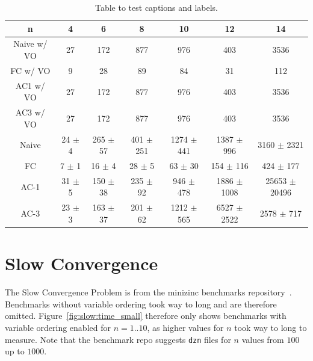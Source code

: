 \begin{table}[h!]
	\centering
	\begin{tabular}{|c|c|c|c|c|c|c|}
		\hline
		n           & 4          & 6            & 8             & 10             & 12              & 14                \\ \hline
		Naive w/ VO & 27         & 172          & 877           & 976            & 403             & 3536              \\ \hline
		FC w/ VO    & 9          & 28           & 89            & 84             & 31              & 112               \\ \hline
		AC1 w/ VO   & 27         & 172          & 877           & 976            & 403             & 3536              \\ \hline
		AC3 w/ VO   & 27         & 172          & 877           & 976            & 403             & 3536              \\ \hline
		Naive       & 24 $\pm$ 4 & 265 $\pm$ 57 & 401 $\pm$ 251 & 1274 $\pm$ 441 & 1387 $\pm$ 996  & 3160 $\pm$ 2321   \\ \hline
		FC          & 7 $\pm$ 1  & 16 $\pm$ 4   & 28 $\pm$ 5    & 63 $\pm$ 30    & 154 $\pm$ 116   & 424 $\pm$ 177     \\ \hline
		AC-1        & 31 $\pm$ 5 & 150 $\pm$ 38 & 235 $\pm$ 92  & 946 $\pm$ 478  & 1886 $\pm$ 1008 & 25653 $\pm$ 20496 \\ \hline
		AC-3        & 23 $\pm$ 3 & 163 $\pm$ 37 & 201 $\pm$ 62  & 1212 $\pm$ 565 & 6527 $\pm$ 2522 & 2578 $\pm$ 717    \\ \hline
	\end{tabular}
	\caption{Table to test captions and labels.}
	\label{tab:queens:iterations}
\end{table}

\section{Slow Convergence}

The Slow Convergence Problem is from the minizinc benchmarks repository~\cite{minizinc_slow:2018}. Benchmarks without variable ordering took way to long and are therefore omitted. Figure~\ref{fig:slow:time_small} therefore only shows benchmarks with variable ordering enabled for $n=1..10$, as higher values for $n$ took way to long to measure. Note that the benchmark repo suggests \verb|dzn| files for $n$ values from $100$ up to $1000$.

